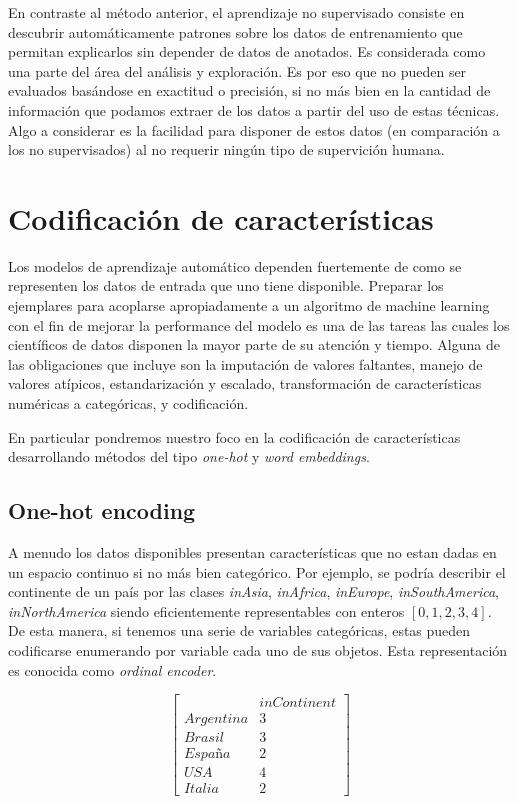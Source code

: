 En contraste al método anterior, el aprendizaje no supervisado consiste en
descubrir automáticamente patrones sobre los datos de entrenamiento que permitan
explicarlos sin depender de datos de anotados. Es considerada como una parte del
área del análisis y exploración. Es por eso que no pueden ser evaluados
basándose en exactitud o precisión, si no más bien en la cantidad de información
que podamos extraer de los datos a partir del uso de estas técnicas. Algo a
considerar es la facilidad para disponer de estos datos (en comparación a los no
supervisados) al no requerir ningún tipo de supervición humana.

\section{Codificación de características}

Los modelos de aprendizaje automático dependen fuertemente de como se
representen los datos de entrada que uno tiene disponible. Preparar los
ejemplares para acoplarse apropiadamente a un algoritmo de machine learning con
el fin de mejorar la performance del modelo es una de las tareas las cuales los
científicos de datos disponen la mayor parte de su atención y tiempo. Alguna de
las obligaciones que incluye son la imputación de valores faltantes, manejo de
valores atípicos, estandarización y escalado, transformación de características
numéricas a categóricas, y codificación.

En particular pondremos nuestro foco en la codificación de características
desarrollando métodos del tipo \emph{one-hot} y \emph{word embeddings}.

\subsection{One-hot encoding}

A menudo los datos disponibles presentan características que no estan dadas en
un espacio continuo si no más bien categórico. Por ejemplo, se podría describir
el continente de un país por las clases \emph{inAsia}, \emph{inAfrica},
\emph{inEurope}, \emph{inSouthAmerica}, \emph{inNorthAmerica} siendo
eficientemente representables con enteros $[0, 1, 2, 3, 4]$. De esta manera, si
tenemos una serie de variables categóricas, estas pueden codificarse enumerando
por variable cada uno de sus objetos. Esta representación es conocida como
\emph{ordinal encoder}.

\begin{equation*}
    \begin{bmatrix}
         & inContinent\\
        Argentina & 3 \\
        Brasil & 3 \\
        España & 2 \\
        USA & 4  \\
        Italia & 2 
    \end{bmatrix}
\end{equation*}

